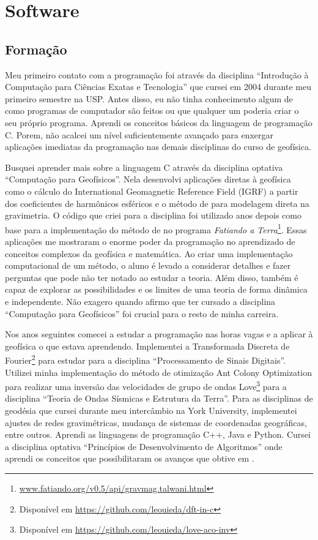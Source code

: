 \section{Software}


\subsection{Formação}

Meu primeiro contato com a programação foi através da disciplina
``Introdução à Computação para Ciências Exatas e Tecnologia''
que cursei em 2004 durante meu primeiro semestre na USP.
Antes disso, eu não tinha conhecimento algum de como programas de computador
são feitos ou que qualquer um poderia criar o seu próprio programa.
Aprendi os conceitos básicos da linguagem de programação C.
Porem, não acalcei um nível suficientemente avançado para enxergar aplicações
imediatas da programação nas demais disciplinas do curso de geofísica.

Busquei aprender mais sobre a linguagem C através da disciplina optativa
``Computação para Geofísicos''.
Nela desenvolvi aplicações diretas à geofísica como o cálculo do International
Geomagnetic Reference Field (IGRF) a partir dos coeficientes de harmônicos
esféricos e o método de \citet{talwani1959} para modelagem direta na
gravimetria.
O código que criei para a disciplina foi utilizado anos depois como base
para a implementação do método de \citet{talwani1959} no programa
\textit{Fatiando a
Terra}\footnote{\url{www.fatiando.org/v0.5/api/gravmag.talwani.html}}.
Essas aplicações me mostraram o enorme poder da programação no aprendizado de
conceitos complexos da geofísica e matemática.
Ao criar uma implementação computacional de um método, o aluno é levado a
considerar detalhes e fazer perguntas que pode não ter notado ao estudar a
teoria.
Além disso, também é capaz de explorar as possibilidades e os limites de uma
teoria de forma dinâmica e independente.
Não exagero quando afirmo que ter cursado a disciplina ``Computação para
Geofísicos'' foi crucial para o resto de minha carreira.

Nos anos seguintes comecei a estudar a programação nas horas vagas e a aplicar
à geofísica o que estava aprendendo.
Implementei a Transformada Discreta de Fourier\footnote{Disponível em
\url{https://github.com/leouieda/dft-in-c}} para estudar para a disciplina
``Processamento de Sinais Digitais''.
Utilizei minha implementação do método de otimização Ant Colony Optimization
\citep{socha2008} para realizar uma inversão das velocidades de grupo de ondas
Love\footnote{Disponível em \url{https://github.com/leouieda/love-aco-inv}}
para a disciplina ``Teoria de Ondas Sísmicas e Estrutura da Terra''.
Para as disciplinas de geodésia que cursei durante meu intercâmbio na York
University, implementei ajustes de redes gravimétricas, mudança de sistemas de
coordenadas geográficas, entre outros.
Aprendi as linguagens de programação C++, Java e Python.
Cursei a disciplina optativa ``Princípios de Desenvolvimento de Algoritmos''
onde aprendi os conceitos que possibilitaram os avanços que obtive em
\citet{tesseroids}.

